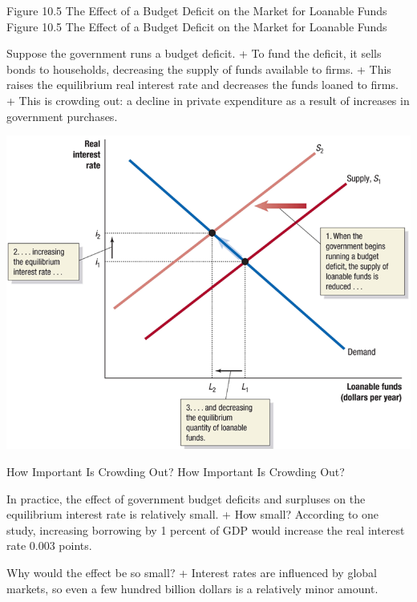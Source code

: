 \documentclass[
  12pt,
  ignorenonframetext,
]{beamer}
\begin{document}
\begin{frame}{Figure 10.5 The Effect of a Budget Deficit on the Market
for Loanable Funds}
\label{figure-10.5-the-effect-of-a-budget-deficit-on-the-market-for-loanable-funds}
Figure 10.5 The Effect of a Budget Deficit on the Market for Loanable
Funds

Suppose the government runs a budget deficit. + To fund the deficit, it
sells bonds to households, decreasing the supply of funds available to
firms. + This raises the equilibrium real interest rate and decreases
the funds loaned to firms. + This is crowding out: a decline in private
expenditure as a result of increases in government purchases.

\includegraphics[width=\textwidth,height=0.99\textheight]{imgs3/img_slide29a.png}
\end{frame}

\begin{frame}{How Important Is Crowding Out?}
\label{how-important-is-crowding-out}
How Important Is Crowding Out?

In practice, the effect of government budget deficits and surpluses on
the equilibrium interest rate is relatively small. + How small?
According to one study, increasing borrowing by 1 percent of GDP would
increase the real interest rate 0.003 points.

Why would the effect be so small? + Interest rates are influenced by
global markets, so even a few hundred billion dollars is a relatively
minor amount.
\end{frame}
\end{document}
